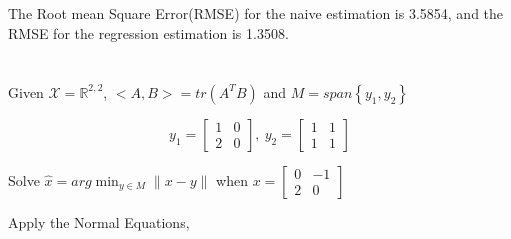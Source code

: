 \documentclass{article}
\theoremstyle{definition} %
\newcommand{\RR}{\mathbb{R}}
\begin{document}
\subsection{}
The Root mean Square Error(RMSE) for the naive estimation is 3.5854, and the RMSE for the regression estimation is 1.3508.

\section{}

Given $\mathcal X = \RR^{2,2}$, $<A, B> = tr(A^TB)$ and $M = span\left\{ y_1, y_2\right\}$

$$
y_1 = 
\begin{bmatrix}
    1 & 0 \\ 2 & 0
\end{bmatrix}, \ 
y_2 = 
\begin{bmatrix}
    1 & 1 \\ 1 & 1
\end{bmatrix}
$$

Solve $\hat x = arg\min_{y\in M} \|x-y\|$ when 
$
x = 
\begin{bmatrix}
    0 & -1 \\ 2 & 0
\end{bmatrix}
$

Apply the Normal Equations,
\end{document}
